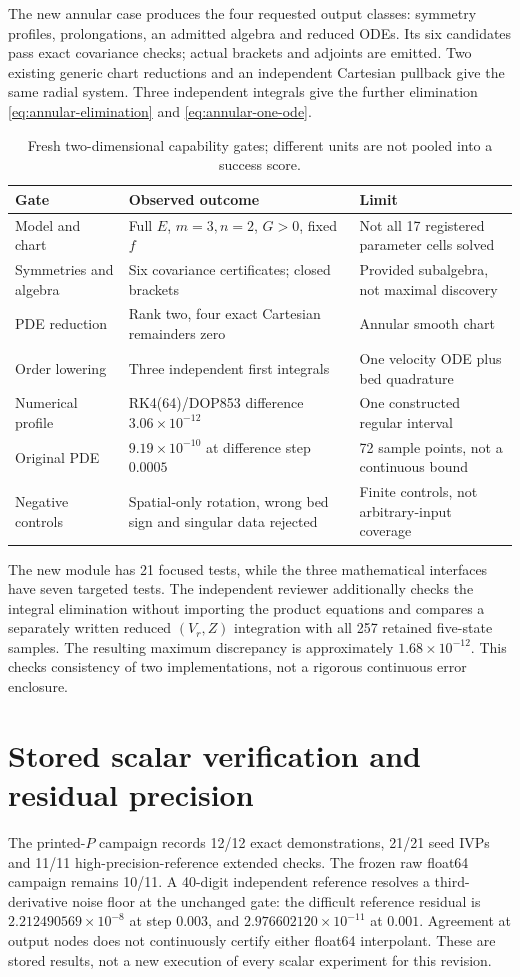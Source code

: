 \documentclass[11pt,a4paper,oneside]{report}
\numberwithin{equation}{chapter}
\begin{document}
The new annular case produces the four requested output classes:
symmetry profiles, prolongations, an admitted algebra and reduced ODEs.
Its six candidates pass exact covariance checks; actual brackets and
adjoints are emitted. Two existing generic chart reductions and an
independent Cartesian pullback give the same radial system.
Three independent integrals give the further elimination
\eqref{eq:annular-elimination} and \eqref{eq:annular-one-ode}.
\begin{table}[htbp]\centering\small
\begin{tabularx}{\textwidth}{@{}p{}XX@{}}\toprule
Gate & Observed outcome & Limit\\\midrule
Model and chart & Full $E$, $m=3,n=2$, $G>0$, fixed $f$ & Not all 17 registered parameter cells solved\\
Symmetries and algebra & Six covariance certificates; closed brackets & Provided subalgebra, not maximal discovery\\
PDE reduction & Rank two, four exact Cartesian remainders zero & Annular smooth chart\\
Order lowering & Three independent first integrals & One velocity ODE plus bed quadrature\\
Numerical profile & RK4(64)/DOP853 difference $3.06\times10^{-12}$ & One constructed regular interval\\
Original PDE & $9.19\times10^{-10}$ at difference step $0.0005$ & 72 sample points, not a continuous bound\\
Negative controls & Spatial-only rotation, wrong bed sign and singular data rejected & Finite controls, not arbitrary-input coverage\\\bottomrule
\end{tabularx}
\caption{Fresh two-dimensional capability gates; different units are not pooled into a success score.}
\label{tab:capability-results}
\end{table}

The new module has 21 focused tests, while the three mathematical interfaces
have seven targeted tests. The independent reviewer additionally checks the
integral elimination without importing the product equations and compares
a separately written reduced $(V_r,Z)$ integration with all 257 retained
five-state samples. The resulting maximum discrepancy is approximately
$1.68\times10^{-12}$. This checks consistency of two implementations,
not a rigorous continuous error enclosure.

\section{Stored scalar verification and residual precision}
The printed-$P$ campaign records 12/12 exact demonstrations, 21/21 seed IVPs
and 11/11 high-precision-reference extended checks.
The frozen raw float64 campaign remains 10/11. A 40-digit independent
reference resolves a third-derivative noise floor at the unchanged gate:
the difficult reference residual is $2.212490569\times10^{-8}$ at step
$0.003$, and $2.976602120\times10^{-11}$ at $0.001$.
Agreement at output nodes does not continuously certify either float64
interpolant. These are stored results, not a new execution of every scalar
experiment for this revision.
\end{document}
